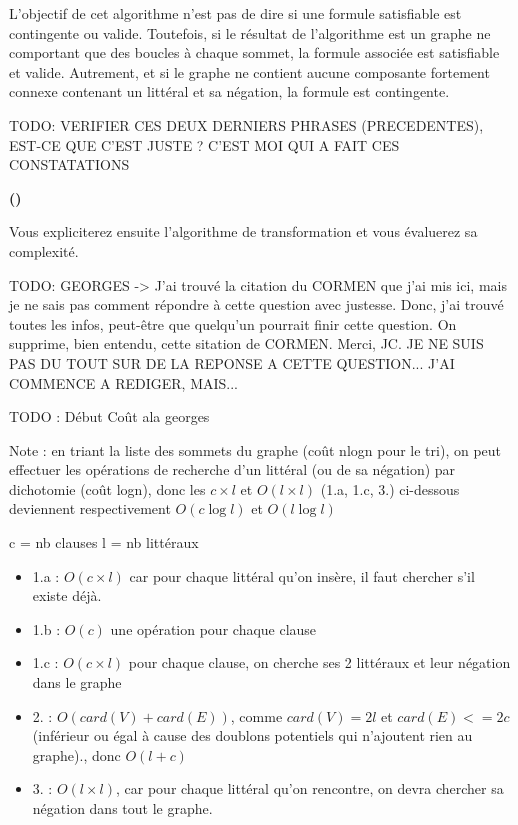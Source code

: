 \documentclass{article}
\newcounter{enoncecount}
\newcounter{sousenoncecount}
\newenvironment{sousenonce}
{
\stepcounter{sousenoncecount}
\bf\small (\alph{sousenoncecount})
\begin{bf}
}
{
\end{bf}
}
\begin{document}
L'objectif de cet algorithme n'est pas de dire si une formule satisfiable est contingente ou valide. Toutefois, si le résultat de l'algorithme est un graphe ne comportant que des boucles à chaque sommet, la formule associée est satisfiable et valide. Autrement, et si le graphe ne contient aucune composante fortement connexe contenant un littéral et sa négation, la formule est contingente.

TODO: VERIFIER CES DEUX DERNIERS PHRASES (PRECEDENTES), EST-CE QUE C'EST JUSTE ? C'EST MOI QUI A FAIT CES CONSTATATIONS


\begin{sousenonce}
Vous expliciterez ensuite l'algorithme de transformation et vous évaluerez sa complexité.
\end{sousenonce}

TODO: GEORGES -> J'ai trouvé la citation du CORMEN que j'ai mis ici, mais je ne sais pas comment répondre à cette question avec justesse. Donc, j'ai trouvé toutes les infos, peut-être que quelqu'un pourrait finir cette question. On supprime, bien entendu, cette sitation de CORMEN. Merci, JC.
JE NE SUIS PAS DU TOUT SUR DE LA REPONSE A CETTE QUESTION... J'AI COMMENCE A REDIGER, MAIS...

TODO : Début Coût ala georges

Note : en triant la liste des sommets du graphe (coût nlogn pour le tri), on peut effectuer les opérations de recherche d'un littéral (ou de sa négation) par dichotomie (coût logn), donc les $c \times l$ et $O(l \times l)$ (1.a, 1.c, 3.) ci-dessous deviennent respectivement $O(c \log l)$ et $O(l \log l)$

c = nb clauses
l = nb littéraux

\begin{itemize}
\item 1.a : $O(c \times l)$ car pour chaque littéral qu'on insère, il faut chercher s'il existe déjà.
\item 1.b : $O(c)$ une opération pour chaque clause
\item 1.c : $O(c \times l)$ pour chaque clause, on cherche ses 2 littéraux et leur négation dans le graphe
\item 2. : $O(card(V) + card(E))$, comme $card(V) = 2l$ et $card(E) <= 2c$ (inférieur ou égal à cause des doublons potentiels qui n'ajoutent rien au graphe)., donc $O(l+c)$
\item 3. : $O(l \times l)$, car pour chaque littéral qu'on rencontre, on devra chercher sa négation dans tout le graphe.
\end{itemize}
\end{document}
